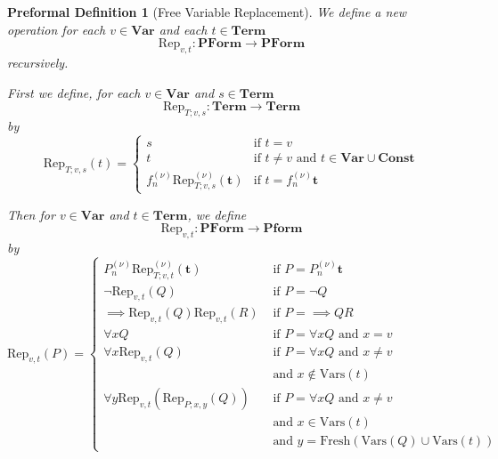 \documentclass[oneside, 12pt]{book}
\theoremstyle{break}
\newtheorem{preformal definition}[definition]{Preformal Definition}
\newtheorem{preformal theorem}[theorem]{Preformal Theorem}
\newcommand{\bv}[1]{\boldsymbol{#1}}
\begin{document}
		\begin{preformal definition}[Free Variable Replacement]
			We define a new operation for each $v \in \textbf{Var}$ and each $t\in \textbf{Term}$
			\begin{equation*}
				\text{Rep}_{v, t}: \textbf{PForm} \to \textbf{PForm}
			\end{equation*}
			recursively.
			
			First we define, for each $v \in \textbf{Var}$ and $s \in \textbf{Term}$
			\begin{equation*}
				\text{Rep}_{T; v, s}: \textbf{Term} \to \textbf{Term}
			\end{equation*}
			by
			\begin{equation*}
				\text{Rep}_{T; v, s}(t) = \begin{cases}
					s &\text{if } t=v\\
					t &\text{if } t\neq v \text{ and } t\in \textbf{Var}\cup \textbf{Const}\\
					f_n^{(\nu)}\text{Rep}_{T; v, s}^{(\nu)}(\bv{t}) &\text{if } t = f_n^{(\nu)} \bv{t} 
				\end{cases}
			\end{equation*}
			
			Then for $v \in \textbf{Var}$ and $t \in \textbf{Term}$, we define
			\begin{equation*}
				\text{Rep}_{v, t}: \textbf{PForm} \to \textbf{Pform}
			\end{equation*}
			by
			\begin{equation*}
				\text{Rep}_{v, t}(P) = \begin{cases}
					P_n^{(\nu)}\text{Rep}_{T; v, t}^{(\nu)}(\bv{t}) &\text{ if } P = P_n^{(\nu)}\bv{t}\\
					\lnot \text{Rep}_{v, t}(Q) &\text{ if } P=\lnot Q\\					
					\implies \text{Rep}_{v, t}(Q)\text{Rep}_{v, t}(R) &\text{ if } P=\implies QR\\
					\forall x Q &\text{ if } P = \forall x Q \text{ and }x=v\\
					\forall x \text{Rep}_{v, t}(Q) &\text{ if } P = \forall x Q \text{ and } x \neq v\\
					&\text{ and } x \not \in \text{Vars}(t)\\
					\forall y \text{Rep}_{v, t}(\text{Rep}_{P; x, y}(Q)) &\text{ if } P=\forall x Q \text{ and } x \neq v\\
					&\text{ and } x \in \text{Vars}(t)\\
					&\text{ and } y = \text{Fresh}(\text{Vars}(Q) \cup \text{Vars}(t))
				\end{cases}
			\end{equation*}
			

\end{preformal definition}
\end{document}
